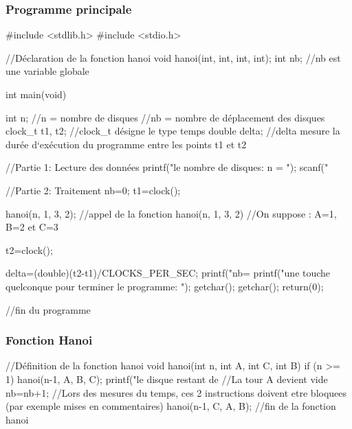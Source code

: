 \documentclass[12pt]{article}
\begin{document}
\subsubsection{Programme principale}
\begin{sql}
#include <stdlib.h>
#include <stdio.h>

//Déclaration de la fonction hanoi
void hanoi(int, int, int, int);
int nb;				
//nb est une variable globale

int main(void)
{
  int n;				
  //n = nombre de disques
  //nb = nombre de déplacement des disques
  clock_t t1, t2;		
  //clock_t désigne le type temps
  double delta;			
  //delta mesure la durée d`exécution du programme entre les points t1 et t2
  
  //Partie 1: Lecture des données
  printf("\nDonner le nombre de disques: n = ");
  scanf("%
				
  //Partie 2: Traitement
  nb=0;
  t1=clock();			

  hanoi(n, 1, 3, 2);          	
  //appel de la fonction hanoi(n, 1, 3, 2)
  //On suppose : A=1, B=2 et C=3
  
  t2=clock();			

  delta=(double)(t2-t1)/CLOCKS_PER_SEC;	  
  printf("\n\n nb=%
  printf("\n\nEntrer une touche quelconque pour terminer le programme: ");
  getchar(); getchar();
  return(0);
}
//fin du programme
\end{sql}

\subsubsection{Fonction Hanoi}

\begin{sql}

//Définition de la fonction hanoi
void hanoi(int n, int A, int C, int B)
{
  if (n >= 1) 
    {
        hanoi(n-1, A, B, C);
        printf(" le disque restant de %
        //La tour A devient vide
        nb=nb+1;		
        //Lors des mesures du temps, ces 2 instructions doivent etre bloquees (par exemple mises en commentaires)
        hanoi(n-1, C, A, B);
    }
}
//fin de la fonction hanoi

\end{sql}
\end{document}
